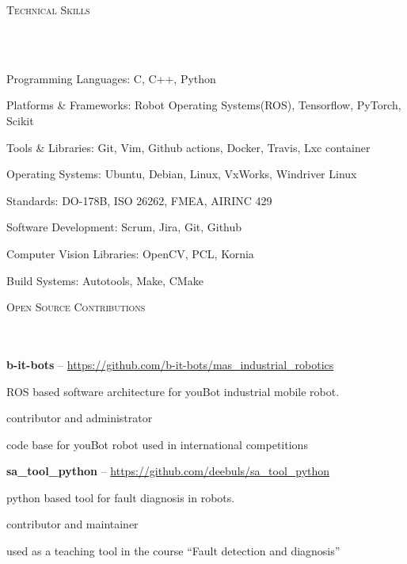 \documentclass{article}
\newcommand{\header}[1]{{
\hspace*{-15pt}\vspace*{6pt} \textsc{#1}} \vspace*{-6pt} 
\lineunder
}
\newcommand{\lineunder}{
\vspace*{-8pt} \\ \hspace*{-18pt} 
\hrulefill \\
}
\newcommand{\employer}[4]{{
\vspace*{2pt}%
\textbf{#1} #2 \hfill #3\\ #4 \vspace*{2pt}}
}
\renewcommand{\labelitemii}{
	\raisebox{0.3ex}{\tiny\textbullet}
}
\newenvironment{bullet-list-major}{
\begin{list}{\labelitemii}{\setlength\leftmargin{3pt} 
\topsep 0pt \itemsep -2pt}}{\vspace*{4pt}\end{list}
}
\newenvironment{bullet-list-minor}{
\begin{list}{\labelitemii}{\setlength\leftmargin{15pt} 
\topsep 0pt \itemsep -2pt}}{\vspace*{4pt}\end{list}
}
\begin{document}
\newpage


\vspace*{4pt}%
\header{Technical Skills}
    \begin{bullet-list-major}
    \item Programming Languages: C, C++, Python
    \vspace{2pt}
    \item Platforms \& Frameworks: Robot Operating Systems(ROS), Tensorflow, PyTorch, Scikit
    \vspace{2pt}
    \item Tools \& Libraries: Git, Vim, Github actions, Docker, Travis, Lxc container
    \vspace{2pt}
    \item Operating Systems: Ubuntu, Debian, Linux, VxWorks, Windriver Linux
    \vspace{2pt}
\item Standards:  DO-178B, ISO 26262, FMEA, AIRINC 429
    \vspace{2pt}
\item Software Development: Scrum, Jira, Git, Github
    \vspace{2pt}
\item Computer Vision Libraries: OpenCV, PCL, Kornia
    \vspace{2pt}
\item Build Systems: Autotools, Make, CMake
    \end{bullet-list-major}


\vspace*{4pt}%
\header{Open Source Contributions}

\employer{b-it-bots}{-- \url{https://github.com/b-it-bots/mas_industrial_robotics}}{}{}
\begin{bullet-list-minor}
    \item ROS based software architecture for youBot industrial mobile robot.
    \item contributor and administrator
    \item code base for youBot robot used in international competitions
\end{bullet-list-minor}
\employer{sa\_tool\_python}{-- \url{https://github.com/deebuls/sa_tool_python} }{}
    {}
    \begin{bullet-list-minor}
    \item python based tool for fault diagnosis in robots.
    \item contributor and maintainer
    \item used as a teaching tool in the course ``Fault detection and diagnosis''
    \end{bullet-list-minor}
\end{document}
